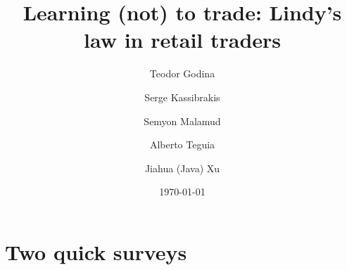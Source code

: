 \documentclass{beamer}
\title[Short title]{Learning (not) to trade: Lindy's law in retail traders} %
\author{Teodor Godina \and Serge Kassibrakis \and Semyon Malamud \and Alberto Teguia \and Jiahua (Java) Xu} %
\institute[EPFL]
{
	Teodor Godina \and Serge Kassibrakis \and Semyon Malamud \and Alberto Teguia \and Jiahua (Java) Xu
\medskip
}
\date{\today} %
\begin{document}
\begin{frame}
\titlepage %
\end{frame}



\section{Two quick surveys}
\end{document}

